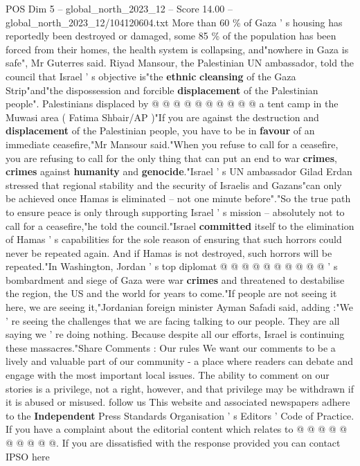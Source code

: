 \begin{textsample}{POS Dim 5 – global\_north\_2023\_12 – Score 14.00 – global\_north\_2023\_12/104120604.txt}
More than 60 \% of Gaza ' s housing has reportedly been destroyed or damaged, some 85 \% of the population has been forced from their homes, the health system is collapsing, and"nowhere in Gaza is safe", Mr Guterres said.
Riyad Mansour, the Palestinian UN ambassador, told the council that Israel ' s objective is"the \textbf{ethnic} \textbf{cleansing} of the Gaza Strip"and"the dispossession and forcible \textbf{displacement} of the Palestinian people".
Palestinians displaced by @ @ @ @ @ @ @ @ @ @ a tent camp in the Muwasi area ( Fatima Shbair/AP )"If you are against the destruction and \textbf{displacement} of the Palestinian people, you have to be in \textbf{favour} of an immediate ceasefire,"Mr Mansour said."When you refuse to call for a ceasefire, you are refusing to call for the only thing that can put an end to war \textbf{crimes}, \textbf{crimes} against \textbf{humanity} and \textbf{genocide}."Israel ' s UN ambassador Gilad Erdan stressed that regional stability and the security of Israelis and Gazans"can only be achieved once Hamas is eliminated -- not one minute before"."So the true path to ensure peace is only through supporting Israel ' s mission -- absolutely not to call for a ceasefire,"he told the council."Israel \textbf{committed} itself to the elimination of Hamas ' s capabilities for the sole reason of ensuring that such horrors could never be repeated again.
And if Hamas is not destroyed, such horrors will be repeated."In Washington, Jordan ' s top diplomat @ @ @ @ @ @ @ @ @ @ ' s bombardment and siege of Gaza were war \textbf{crimes} and threatened to destabilise the region, the US and the world for years to come."If people are not seeing it here, we are seeing it,"Jordanian foreign minister Ayman Safadi said, adding :"We ' re seeing the challenges that we are facing talking to our people.
They are all saying we ' re doing nothing.
Because despite all our efforts, Israel is continuing these massacres."Share Comments : Our rules We want our comments to be a lively and valuable part of our community - a place where readers can debate and engage with the most important local issues.
The ability to comment on our stories is a privilege, not a right, however, and that privilege may be withdrawn if it is abused or misused. follow us This website and associated newspapers adhere to the \textbf{Independent} Press Standards Organisation ' s Editors ' Code of Practice.
If you have a complaint about the editorial content which relates to @ @ @ @ @ @ @ @ @ @.
If you are dissatisfied with the response provided you can contact IPSO here

\end{textsample}
